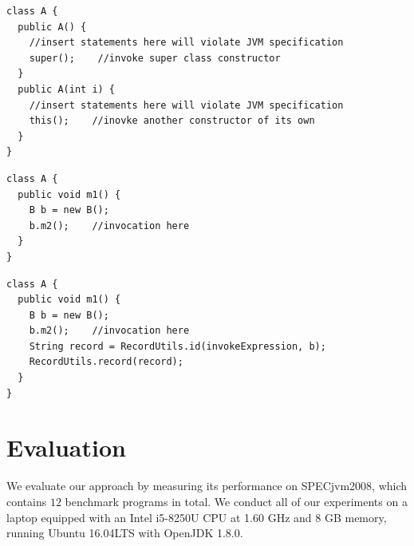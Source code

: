\documentclass{fac}
\begin{document}
\begin{minipage}{\linewidth}
\vspace{10pt}
\begin{lstlisting}[caption={Java specification on constructor},label={lst:spec-constructor}]
class A {
  public A() {
    //insert statements here will violate JVM specification
    super();	//invoke super class constructor
  }
  public A(int i) {
    //insert statements here will violate JVM specification
    this();    //inovke another constructor of its own
  }
}
\end{lstlisting}
\end{minipage}

\begin{minipage}{\linewidth}
\vspace{10pt}
\begin{lstlisting}[caption={Example code before instrumentation},label={lst:before-instru}]
class A {
  public void m1() {
    B b = new B();
    b.m2();    //invocation here
  }
}
\end{lstlisting}
\end{minipage}

\begin{minipage}{\linewidth}
\vspace{10pt}
\begin{lstlisting}[caption={Example code after instrumentation},label={lst:after-instru}]
class A {
  public void m1() {
    B b = new B();
    b.m2();    //invocation here
    String record = RecordUtils.id(invokeExpression, b);
    RecordUtils.record(record);
  }
}
\end{lstlisting}
\end{minipage}

\section{Evaluation}\label{sec:evaluation}
We evaluate our approach by measuring its performance on SPECjvm2008, which contains $12$ benchmark programs in total. We conduct all of our experiments on a laptop equipped with an Intel i5-8250U CPU at 1.60 GHz and 8 GB memory, running Ubuntu 16.04LTS with OpenJDK 1.8.0.
\end{document}
